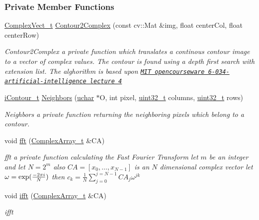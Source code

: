 \subsubsection*{Private Member Functions}
\begin{DoxyCompactItemize}
\item 
\hyperlink{_soil_math_types_8h_a7567e521c2b2c408dcb62dbff72390f7}{Complex\+Vect\+\_\+t} \hyperlink{class_soil_math_1_1_f_f_t_a18a95490ea8e929584c2af6569dec3b6}{Contour2\+Complex} (const cv\+::\+Mat \&img, float center\+Col, float center\+Row)
\begin{DoxyCompactList}\small\item\em Contour2\+Complex a private function which translates a continous contour image to a vector of complex values. The contour is found using a depth first search with extension list. The alghorithm is based upon \href{http://ocw.mit.edu/courses/electrical-engineering-and-computer-science/6-034-artificial-intelligence-fall-2010/lecture-videos/lecture-4-search-depth-first-hill-climbing-beam/}{\tt M\+I\+T opencourseware 6-\/034-\/artificial-\/intelligence lecture 4} \end{DoxyCompactList}\item 
\hyperlink{_soil_math_types_8h_a1ade796add2f13888dfa9e6bde0bdc37}{i\+Contour\+\_\+t} \hyperlink{class_soil_math_1_1_f_f_t_a45b32ad009154112d2fc4e467fc7c5ac}{Neighbors} (\hyperlink{_soil_math_types_8h_a65f85814a8290f9797005d3b28e7e5fc}{uchar} $\ast$O, int pixel, \hyperlink{_soil_math_types_8h_a435d1572bf3f880d55459d9805097f62}{uint32\+\_\+t} columns, \hyperlink{_soil_math_types_8h_a435d1572bf3f880d55459d9805097f62}{uint32\+\_\+t} rows)
\begin{DoxyCompactList}\small\item\em Neighbors a private function returning the neighboring pixels which belong to a contour. \end{DoxyCompactList}\item 
void \hyperlink{class_soil_math_1_1_f_f_t_a48bc7ad948d820d6f87b3e353b6d1cd4}{fft} (\hyperlink{_soil_math_types_8h_a5118c9f6b02a06945c93a3893e51febe}{Complex\+Array\+\_\+t} \&C\+A)
\begin{DoxyCompactList}\small\item\em fft a private function calculating the Fast Fourier Transform let $ m $ be an integer and let $ N=2^m $ also $ CA=[x_0,\ldots,x_{N-1}] $ is an $ N $ dimensional complex vector let $ \omega=\exp({-2\pi i\over N}) $ then $ c_k={\frac{1}{N}}\sum_{j=0}^{j=N-1}CA_j\omega^{jk} $ \end{DoxyCompactList}\item 
void \hyperlink{class_soil_math_1_1_f_f_t_a5b7f18d1cb2d728584414d8660d52586}{ifft} (\hyperlink{_soil_math_types_8h_a5118c9f6b02a06945c93a3893e51febe}{Complex\+Array\+\_\+t} \&C\+A)
\begin{DoxyCompactList}\small\item\em ifft \end{DoxyCompactList}\end{DoxyCompactItemize}
